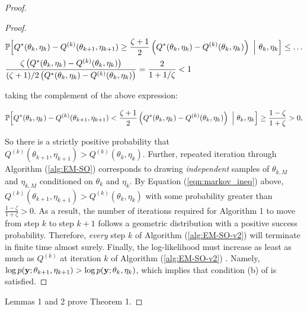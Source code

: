 \begin{proof}
\begin{proof}
\begin{align}
    & \mathbb{P} \Big[Q^*(\theta_{k},\eta_{k}) - Q^{(k)}(\theta_{k+1},\eta_{k+1}) \geq \frac{\zeta + 1}{2} \left(Q^*(\theta_{k},\eta_{k}) - Q^{(k)}(\theta_{k},\eta_{k}) \right) ~\Big\vert~ \theta_k, \eta_k \Big] \leq \ldots \\
    & \frac{\zeta \left( Q^*(\theta_{k},\eta_{k}) - Q^{(k)}(\theta_k,\eta_k) \right)}{(\zeta+1)/2 \left( Q^*(\theta_{k},\eta_{k}) - Q^{(k)}(\theta_k,\eta_k) \right)} = \frac{2}{1 + 1/\zeta} < 1
\end{align}

taking the complement of the above expression:

\begin{equation}
    \mathbb{P} \Big[Q^*(\theta_{k},\eta_{k}) - Q^{(k)}(\theta_{k+1},\eta_{k+1}) < \frac{\zeta + 1}{2} \left(Q^*(\theta_{k},\eta_{k}) - Q^{(k)}(\theta_{k},\eta_{k}) \right) ~\Big\vert~ \theta_k, \eta_k \Big] \geq \frac{1-\zeta}{1 + \zeta} > 0 \label{eqn:markov_ineq},
\end{equation}

So there is a strictly positive probability that $Q^{(k)}(\theta_{k+1},\eta_{k+1}) > Q^{(k)}(\theta_{k},\eta_{k})$. Further, repeated iteration through Algorithm (\ref{alg:EM-SO}) corresponds to drawing \textit{independent} samples of $\theta_{k,M}$ and $\eta_{k,M}$ conditioned on $\theta_k$ and $\eta_k$. By Equation (\ref{eqn:markov_ineq}) above, $Q^{(k)}(\theta_{k+1},\eta_{k+1}) > Q^{(k)}(\theta_{k},\eta_{k})$ with some probability greater than $\frac{1-\zeta}{1+\zeta} > 0$. As a result, the number of iterations required for Algorithm 1 to move from step $k$ to step $k+1$ follows a geometric distribution with a positive success probability. Therefore, \textit{every} step $k$ of Algorithm (\ref{alg:EM-SO-v2}) will terminate in finite time almost surely. Finally, the log-likelihood must increase as least as much as $Q^{(k)}$ at iteration $k$ of Algorithm (\ref{alg:EM-SO-v2}) \citep{Dempster:1977}. Namely, $\log p(\mathbf{y} ; \theta_{k+1},\eta_{k+1}) > \log p(\mathbf{y} ; \theta_k,\eta_k)$, which implies that condition (b) of \citet{Wu:1983} is satisfied.
\end{proof}

Lemmas 1 and 2 prove Theorem 1.




\end{proof}
